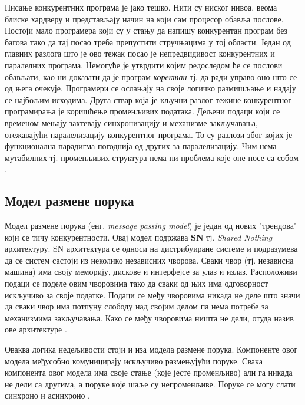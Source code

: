 \documentclass[12pt,oneside]{memoir}
\begin{document}
Писање конкурентних програма је јако тешко. Нити су ниског нивоа, веома блиске хардверу и представљају начин на који сам процесор обавља послове. Постоји мало програмера који су у стању да напишу конкурентан програм без багова тако да тај посао треба препустити стручњацима у тој области. Један од главних разлога што је ово тежак посао је непредвидивост конкурентних и паралелних програма. Немогуће је утврдити којим редоследом ће се послови обављати, као ни доказати да је програм \textit{коректан} тј. да ради управо оно што се од њега очекује. Програмери се ослањају на своје логичко размишљање и надају се најбољим исходима. Друга ствар која је кључни разлог тежине конкурентног програмирања је коришћење променљивих података. Дељени подаци који се временом мењају захтевају синхронизацију и механизме закључавања, отежавајући паралелизацију конкурентног програма. То су разлози због којих је функционална парадигма погоднија од других за паралелизацију. Чим нема мутабилних тј. променљивих структура нема ни проблема које оне носе са собом \cite{progInScala3}.

\subsection{Модел размене порука}

Модел размене порука (енг. \textit{message passing model}) је један од нових "трендова" који се тичу конкурентности. Овај модел подржава \textbf{SN} тј. \textit{Shared Nothing} архитектуру. SN архитектура се односи на дистрибуиране системе и подразумева да се систем састоји из неколико независних чворова. Сваки чвор (тј. независна машина) има своју меморију, дискове и интерфејсе за улаз и излаз. Расположиви подаци се поделе овим чворовима тако да сваки од њих има одговорност искључиво за своје податке. Подаци се међу чворовима никада не деле што значи да сваки чвор има потпуну слободу над својим делом па нема потребе за механизмима закључавања. Како се међу чворовима ништа не дели, отуда назив ове архитектуре \cite{SNvsSD, warehouse}.

Оваква логика недељивости стоји и иза модела размене порука. Компоненте овог модела међусобно комуницирају искључиво размењујући поруке. Свака компонента овог модела има своје стање (које јесте променљиво) али га никада не дели са другима, а поруке које шаље су \underline{непроменљиве}. Поруке се могу слати синхроно и асинхроно \cite{progInScala}.
\end{document}
